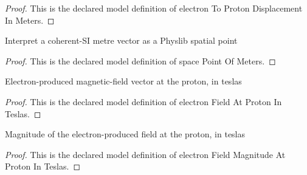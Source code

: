 \begin{proof}
  This is the declared model definition of electron To Proton Displacement In Meters.
\end{proof}
\begin{definition}
  \label{def:physics:phyx-mini-0959:phyxminiproblems-problemphyxmini0959-spacepointofmeters}
  Interpret a coherent-SI metre vector as a Physlib spatial point
\end{definition}
\begin{proof}
  This is the declared model definition of space Point Of Meters.
\end{proof}
\begin{definition}
  \label{def:physics:phyx-mini-0959:phyxminiproblems-problemphyxmini0959-electronfieldatprotoninteslas}
  Electron-produced magnetic-field vector at the proton, in teslas
\end{definition}
\begin{proof}
  This is the declared model definition of electron Field At Proton In Teslas.
\end{proof}
\begin{definition}
  \label{def:physics:phyx-mini-0959:phyxminiproblems-problemphyxmini0959-electronfieldmagnitudeatprotoninteslas}
  Magnitude of the electron-produced field at the proton, in teslas
\end{definition}
\begin{proof}
  This is the declared model definition of electron Field Magnitude At Proton In Teslas.
\end{proof}
